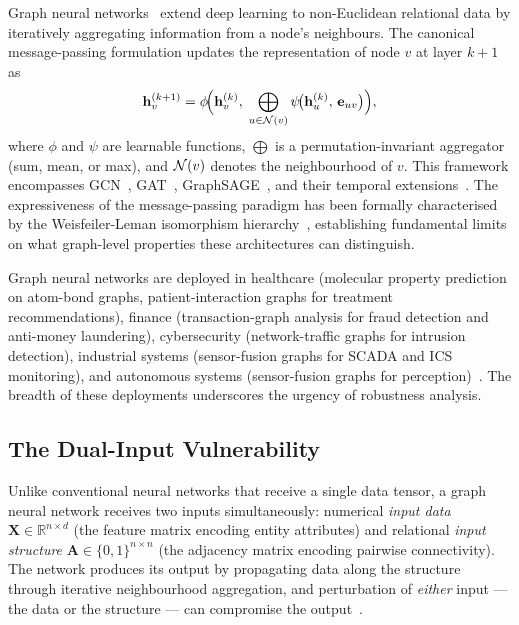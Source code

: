 Graph neural networks~\cite{Kipf2017,Velickovic2018,Hamilton2017} extend deep learning to non-Euclidean relational data by iteratively aggregating information from a node's neighbours. The canonical message-passing formulation updates the representation of node $v$ at layer $k+1$ as
\begin{equation}
\mathbf{h}_v^{(k+1)}
= \phi\!\Bigl(\mathbf{h}_v^{(k)},\;
  \bigoplus_{u\in\mathcal{N}(v)}
    \psi\!\bigl(\mathbf{h}_u^{(k)},\, \mathbf{e}_{uv}\bigr)\Bigr),
\label{eq:ch1_mp}
\end{equation}
where $\phi$ and $\psi$ are learnable functions, $\bigoplus$ is a permutation-invariant aggregator (sum, mean, or max), and $\mathcal{N}(v)$ denotes the neighbourhood of $v$. This framework encompasses GCN~\cite{Kipf2017}, GAT~\cite{Velickovic2018}, GraphSAGE~\cite{Hamilton2017}, and their temporal extensions~\cite{Xu2020tgat,Rossi2020,Pei2020tgn,Kazemi2020,Schlichtkrull2018}. The expressiveness of the message-passing paradigm has been formally characterised by the Weisfeiler-Leman isomorphism hierarchy~\cite{Xu2019gin}, establishing fundamental limits on what graph-level properties these architectures can distinguish.

Graph neural networks are deployed in healthcare (molecular property prediction on atom-bond graphs, patient-interaction graphs for treatment recommendations), finance (transaction-graph analysis for fraud detection and anti-money laundering), cybersecurity (network-traffic graphs for intrusion detection), industrial systems (sensor-fusion graphs for SCADA and ICS monitoring), and autonomous systems (sensor-fusion graphs for perception)~\cite{Goodfellow2014gan,Gilmer2017,Gilmer2018,Ying2021,Wu2021,Luo2021}. The breadth of these deployments underscores the urgency of robustness analysis.


\subsection{The Dual-Input Vulnerability}

Unlike conventional neural networks that receive a single data tensor, a graph neural network receives two inputs simultaneously: numerical \emph{input data} $\mathbf{X}\in\mathbb{R}^{n\times d}$ (the feature matrix encoding entity attributes) and relational \emph{input structure} $\mathbf{A}\in\{0,1\}^{n\times n}$ (the adjacency matrix encoding pairwise connectivity). The network produces its output by propagating data along the structure through iterative neighbourhood aggregation, and perturbation of \emph{either} input --- the data or the structure --- can compromise the output~\cite{Zuegner2018,Bojchevski2019,Dai2018}.

